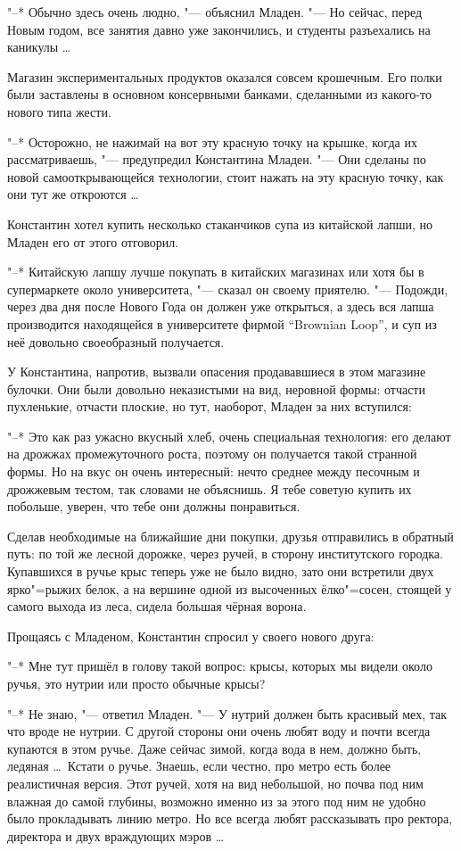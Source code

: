 "--* Обычно здесь очень людно, "--- объяснил Младен.
"--- Но сейчас, перед Новым годом, все занятия давно уже закончились, и студенты
разъехались на каникулы \ldots

Магазин экспериментальных продуктов оказался совсем крошечным.
Его полки были заставлены в основном консервными банками, сделанными из
какого-то нового типа жести.

"--* Осторожно, не нажимай на вот эту красную точку на крышке, когда их
рассматриваешь, "--- предупредил Константина Младен.
"--- Они сделаны по новой самооткрывающейся технологии, стоит нажать на эту
красную точку, как они тут же откроются \ldots

Константин хотел купить несколько стаканчиков супа из китайской лапши, но Младен
его от этого отговорил.

"--* Китайскую лапшу лучше покупать в китайских магазинах или хотя бы в
супермаркете около университета, "--- сказал он своему приятелю.
"--- Подожди, через два дня после Нового Года он должен уже открыться, а здесь
вся лапша производится находящейся в университете фирмой
\enquote{\foreignlanguage{english}{Brownian Loop}},
и суп из неё довольно своеобразный получается.

У Константина, напротив, вызвали опасения продававшиеся в этом магазине булочки.
Они были довольно неказистыми на вид, неровной формы: отчасти пухленькие,
отчасти плоские, но тут, наоборот, Младен за них вступился:

"--* Это как раз ужасно вкусный хлеб, очень специальная технология: его делают
на дрожжах промежуточного роста, поэтому он получается такой странной формы.
Но на вкус он очень интересный: нечто среднее между песочным и дрожжевым тестом,
так словами не объяснишь.
Я тебе советую купить их побольше, уверен, что тебе они должны понравиться.

Сделав необходимые на ближайшие дни покупки, друзья отправились в обратный путь:
по той же лесной дорожке, через ручей, в сторону институтского городка.
Купавшихся в ручье крыс теперь уже не было видно, зато они встретили двух
ярко"=рыжих белок, а на вершине одной из высоченных ёлко"=сосен, стоящей у
самого выхода из леса, сидела большая чёрная ворона.

Прощаясь с Младеном, Константин спросил у своего нового друга:

"--* Мне тут пришёл в голову такой вопрос: крысы, которых мы видели около ручья,
это нутрии или просто обычные крысы?

"--* Не знаю, "--- ответил Младен.
"--- У нутрий должен быть красивый мех, так что вроде не нутрии.
С другой стороны они очень любят воду и почти всегда купаются в этом ручье.
Даже сейчас зимой, когда вода в нем, должно быть, ледяная \ldots\
Кстати о ручье.
Знаешь, если честно, про метро есть более реалистичная версия.
Этот ручей, хотя на вид небольшой, но почва под ним влажная до самой глубины,
возможно именно из за этого под ним не удобно было прокладывать линию метро.
Но все всегда любят рассказывать про ректора, директора и двух враждующих
мэров \ldots

